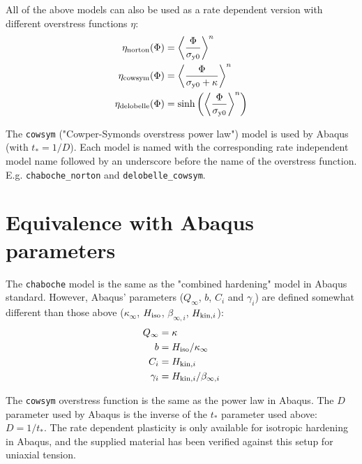\documentclass[10pt,a4paper]{article}
\begin{document}
All of the above models can also be used as a rate dependent version with different overstress functions $\eta$:
\begin{align*}
\eta_{\mathrm{norton}}(\Phi) &= \left\langle \frac{\Phi}{\sigma_{\mathrm{y0}}} \right\rangle^n \\
\eta_{\mathrm{cowsym}}(\Phi) &= \left\langle \frac{\Phi}{\sigma_{\mathrm{y0}}+\kappa} \right\rangle^n \\
\eta_{\mathrm{delobelle}}(\Phi) &= \sinh\left(\left\langle \frac{\Phi}{\sigma_{\mathrm{y0}}} \right\rangle^n\right)
\end{align*}

The \nolinkurl{cowsym} ("Cowper-Symonds overstress power law") model is used by Abaqus (with $t_*=1/D$). Each model is named with the corresponding rate independent model name followed by an underscore before the name of the overstress function. E.g. \nolinkurl{chaboche_norton} and  \nolinkurl{delobelle_cowsym}.

\section{Equivalence with Abaqus parameters}
The \nolinkurl{chaboche} model is the same as the "combined hardening" model in Abaqus standard. However, Abaqus' parameters ($Q_\infty$, $b$, $C_i$ and $\gamma_i$) are defined somewhat different than those above ($\kappa_\infty$, $H_{\mathrm{iso}}$, $\beta_{\infty,i}$, $H_{\mathrm{kin}, i}$):
\begin{align}
Q_\infty &= \kappa			\\
b &= H_{\mathrm{iso}}/\kappa_\infty 	\\
C_i &= H_{\mathrm{kin}, i} 				\\
\gamma_i &= H_{\mathrm{kin}, i}/\beta_{\infty,i}
\end{align}

The \nolinkurl{cowsym} overstress function is the same as the power law in Abaqus. The $D$ parameter used by Abaqus is the inverse of the $t_*$ parameter used above: $D=1/t_*$. The rate dependent plasticity is only available for isotropic hardening in Abaqus, and the supplied material has been verified against this setup for uniaxial tension. 
\end{document}
